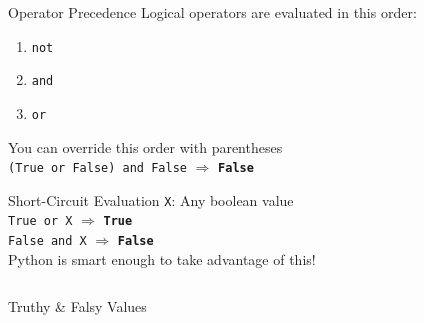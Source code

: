         \begin{frame}{Operator Precedence}
            \LARGE
            Logical operators are evaluated in this order:
            \begin{enumerate}
                \item \texttt{not}
                \item \texttt{and}
                \item \texttt{or}
            \end{enumerate}
            \pause
            \medskip
            You can override this order with parentheses\\
            \pause
            \smallskip
            \texttt{(True or False) and False} $\Rightarrow$
            \pause
            \textbf{\texttt{False}} \\
        \end{frame}

        \begin{frame}{Short-Circuit Evaluation}
            \LARGE
            \texttt{X}: Any boolean value\\
            \texttt{True or X} $\Rightarrow$
            \pause
            \textbf{\texttt{True}}\\
            \pause
            \texttt{False and X} $\Rightarrow$
            \pause
            \textbf{\texttt{False}}\\
            \pause
            Python is smart enough to take advantage of this!
            \pause
            \medskip
            \inputminted[frame=single,framesep=2pt]{python3}{code-examples/short_circuit.py}
        \end{frame}

        \begin{frame}[c]{Truthy \& Falsy Values}
            \begin{columns}
                    \inputminted[firstline=1, lastline=8, frame=single,framesep=2pt]{python3}{code-examples/truthy-falsy.py}
                \pause
                    \inputminted[firstline=9, lastline=16, frame=single,framesep=2pt]{python3}{code-examples/truthy-falsy.py}
            \end{columns}
        \end{frame}

